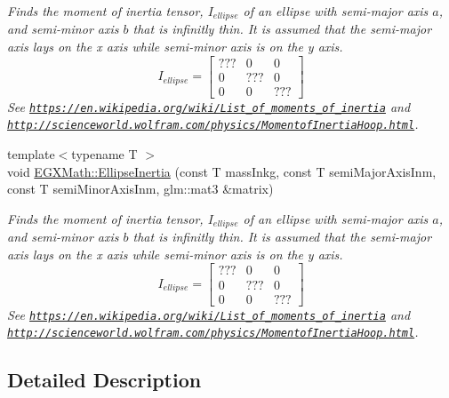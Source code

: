 \begin{DoxyCompactItemize}
\begin{DoxyCompactList}\small\item\em Finds the moment of inertia tensor, $I_{ellipse}$ of an ellipse with semi-\/major axis $a$, and semi-\/minor axis $b$ that is infinitly thin. It is assumed that the semi-\/major axis lays on the x axis while semi-\/minor axis is on the y axis. \[ I_{ellipse}=\begin{bmatrix} ??? & 0 & 0\\ 0 & ??? & 0\\ 0 & 0 & ??? \end{bmatrix} \] See \href{https://en.wikipedia.org/wiki/List_of_moments_of_inertia}{\tt https\+://en.\+wikipedia.\+org/wiki/\+List\+\_\+of\+\_\+moments\+\_\+of\+\_\+inertia} and \href{http://scienceworld.wolfram.com/physics/MomentofInertiaHoop.html}{\tt http\+://scienceworld.\+wolfram.\+com/physics/\+Momentof\+Inertia\+Hoop.\+html}. \end{DoxyCompactList}\item 
{\footnotesize template$<$typename T $>$ }\\void \mbox{\hyperlink{group___e_g_x_math-_geometry-2_d-_ellipse-_inertia_gad679a65dc7550e27dc69c1d328c94732}{E\+G\+X\+Math\+::\+Ellipse\+Inertia}} (const T mass\+Inkg, const T semi\+Major\+Axis\+Inm, const T semi\+Minor\+Axis\+Inm, glm\+::mat3 \&matrix)
\begin{DoxyCompactList}\small\item\em Finds the moment of inertia tensor, $I_{ellipse}$ of an ellipse with semi-\/major axis $a$, and semi-\/minor axis $b$ that is infinitly thin. It is assumed that the semi-\/major axis lays on the x axis while semi-\/minor axis is on the y axis. \[ I_{ellipse}=\begin{bmatrix} ??? & 0 & 0\\ 0 & ??? & 0\\ 0 & 0 & ??? \end{bmatrix} \] See \href{https://en.wikipedia.org/wiki/List_of_moments_of_inertia}{\tt https\+://en.\+wikipedia.\+org/wiki/\+List\+\_\+of\+\_\+moments\+\_\+of\+\_\+inertia} and \href{http://scienceworld.wolfram.com/physics/MomentofInertiaHoop.html}{\tt http\+://scienceworld.\+wolfram.\+com/physics/\+Momentof\+Inertia\+Hoop.\+html}. \end{DoxyCompactList}\end{DoxyCompactItemize}


\subsection{Detailed Description}


